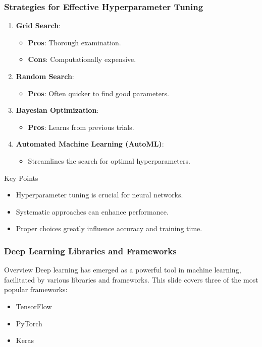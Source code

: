\documentclass[aspectratio=169]{beamer}
\begin{document}
\begin{frame}[fragile]
    \frametitle{Strategies for Effective Hyperparameter Tuning}
    \begin{enumerate}
        \item \textbf{Grid Search}:
            \begin{itemize}
                \item \textbf{Pros}: Thorough examination.
                \item \textbf{Cons}: Computationally expensive.
            \end{itemize}
        \item \textbf{Random Search}:
            \begin{itemize}
                \item \textbf{Pros}: Often quicker to find good parameters.
            \end{itemize}
        \item \textbf{Bayesian Optimization}:
            \begin{itemize}
                \item \textbf{Pros}: Learns from previous trials.
            \end{itemize}
        \item \textbf{Automated Machine Learning (AutoML)}:
            \begin{itemize}
                \item Streamlines the search for optimal hyperparameters.
            \end{itemize}
    \end{enumerate}
    
    \begin{block}{Key Points}
        \begin{itemize}
            \item Hyperparameter tuning is crucial for neural networks.
            \item Systematic approaches can enhance performance.
            \item Proper choices greatly influence accuracy and training time.
        \end{itemize}
    \end{block}
\end{frame}

\begin{frame}
    \frametitle{Deep Learning Libraries and Frameworks}
    \begin{block}{Overview}
        Deep learning has emerged as a powerful tool in machine learning, facilitated by various libraries and frameworks. This slide covers three of the most popular frameworks:
    \end{block}
    \begin{itemize}
        \item TensorFlow
        \item PyTorch
        \item Keras
    \end{itemize}
\end{frame}
\end{document}
